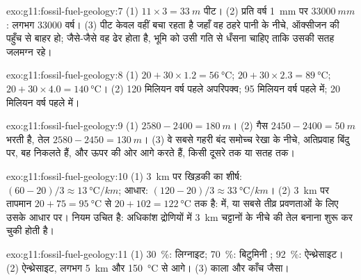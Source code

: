 \begin{solution}{exo:g11:fossil-fuel-geology:7}
(1) $11 \times 3 = \qty{33}{m}$ पीट। (2) प्रति वर्ष \qty{1}{mm} पर
$\qty{33000}{mm}$: लगभग \num{33000} वर्ष। (3) पीट केवल वहीं बचा रहता है जहाँ
वह ठहरे पानी के नीचे, ऑक्सीजन की पहुँच से बाहर हो; जैसे-जैसे वह ढेर होता है,
भूमि को उसी गति से धँसना चाहिए ताकि उसकी सतह जलमग्न रहे।
\end{solution}

\begin{solution}{exo:g11:fossil-fuel-geology:8}
(1) $20 + 30 \times 1.2 = \qty{56}{\degreeCelsius}$;
$20 + 30 \times 2.3 = \qty{89}{\degreeCelsius}$;
$20 + 30 \times 4.0 = \qty{140}{\degreeCelsius}$।
(2) 120 मिलियन वर्ष पहले अपरिपक्व; 95 मिलियन वर्ष पहले 
में; 20 मिलियन वर्ष पहले  में।
\end{solution}

\begin{solution}{exo:g11:fossil-fuel-geology:9}
(1) $2580 - 2400 = \qty{180}{m}$। (2) गैस
$2450 - 2400 = \qty{50}{m}$ भरती है, तेल $2580 - 2450 = \qty{130}{m}$। (3) वे सबसे गहरी बंद
समोच्च रेखा के नीचे, अतिप्रवाह बिंदु पर, बह निकलते हैं, और ऊपर की ओर आगे  करते हैं,
किसी दूसरे  तक या सतह तक।
\end{solution}

\begin{solution}{exo:g11:fossil-fuel-geology:10}
(1) \qty{3}{km} पर खिड़की का शीर्ष: $(60 - 20)/3 \approx
\qty{13}{\degreeCelsius/km}$; आधार: $(120 - 20)/3 \approx
\qty{33}{\degreeCelsius/km}$। (2) \qty{3}{km} पर तापमान
$20 + 75 = \qty{95}{\degreeCelsius}$ से $20 + 102 = \qty{122}{\degreeCelsius}$ तक है:
 में, या सबसे तीव्र प्रवणताओं के लिए उसके आधार पर। नियम
उचित है: अधिकांश द्रोणियों में \qty{3}{km} चट्टानों के नीचे की 
तेल बनाना शुरू कर चुकी होती है।
\end{solution}

\begin{solution}{exo:g11:fossil-fuel-geology:11}
(1) \qty{30}{\percent}: लिग्नाइट; \qty{70}{\percent}: बिटुमिनी ;
\qty{92}{\percent}: ऐन्थ्रेसाइट। (2) ऐन्थ्रेसाइट, लगभग
\qty{5}{km} और \qty{150}{\degreeCelsius} से आगे। (3) काला और काँच जैसा।
\end{solution}

